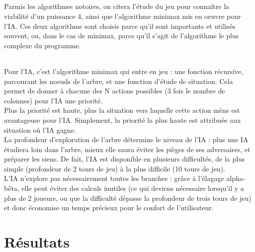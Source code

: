 \documentclass{report}
\begin{document}
    \paragraph*{} %
    Parmis les algorithmes notoires, on citera l'étude du jeu pour connaître la viabilité d'un puissance 4, ainsi que l'algorithme minimax mis en oeuvre pour l'IA.
    Ces deux algorithme sont choisis parce qu'il sont importants et utilisés souvent, ou, dans le cas de minimax, parce qu'il s'agit de l'algorithme le plus complexe du programme.
        \subparagraph*{} %

        \subparagraph*{} %
        Pour l'IA, c'est l'algorithme minimax qui entre en jeu : une fonction récursive, parcourant les noeuds de l'arbre, et une fonction d'étude de situation. 
        Cela permet de donner à chacune des N actions possibles (3 fois le nombre de colonnes) pour l'IA une priorité. \\
        Plus la priorité est haute, plus la situation vers laquelle cette action mène est avantageuse pour l'IA. Simplement, la priorité la plus haute est attribuée aux situation où 
        l'IA gagne. \\
        La profondeur d'exploration de l'arbre détermine le niveau de l'IA : plus une IA étudiera loin dans l'arbre, mieux elle saura éviter les pièges de ses adversaires, et préparer
        les siens. De fait, l'IA est disponible en plusieurs difficultés, de la plus simple (profondeur de 2 tours de jeu) à la plus difficile (10 tours de jeu). \\
        L'IA n'explore pas nécessairement toutes les branches : grâce à l'élagage alpha-bêta, elle peut éviter des calculs inutiles (ce qui deviens nécessaire lorsqu'il y a plus 
        de 2 joueurs, ou que la difficulté dépasse la profondeur de trois tours de jeu) et donc économise un temps précieux pour le confort de l'utilisateur.


\chapter{Résultats}
    \paragraph*{} %
    \paragraph*{} %
    \paragraph*{} %
    \paragraph*{} %
\end{document}
